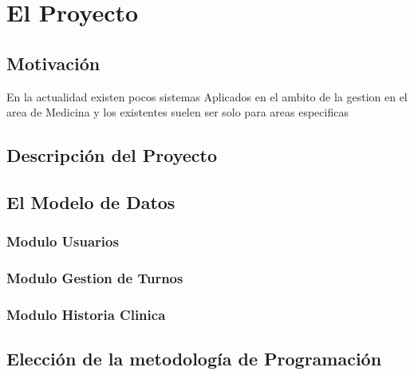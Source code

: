 \chapter{El Proyecto}

\section{Motivación}

En la actualidad existen pocos sistemas Aplicados en el ambito de la gestion en
el area de Medicina y los existentes suelen ser solo para areas especificas

\section{Descripción del Proyecto}



\section{El Modelo de Datos}

\subsection{Modulo Usuarios}

\subsection{Modulo Gestion de Turnos}

\subsection{Modulo Historia Clinica}

\section{Elección de la metodología de Programación}

